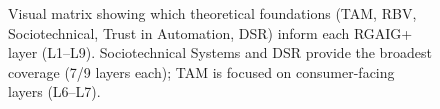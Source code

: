 \begin{figure}[!htbp]
{}
\caption[Theory--Layer Coverage Matrix]{Visual matrix showing which theoretical foundations (TAM, RBV, Sociotechnical, Trust in Automation, DSR) inform each RGAIG+ layer (L1--L9). Sociotechnical Systems and DSR provide the broadest coverage (7/9 layers each); TAM is focused on consumer-facing layers (L6--L7).}
\label{fig:rgaig_theory_layer_matrix}
\end{figure}

\clearpage
